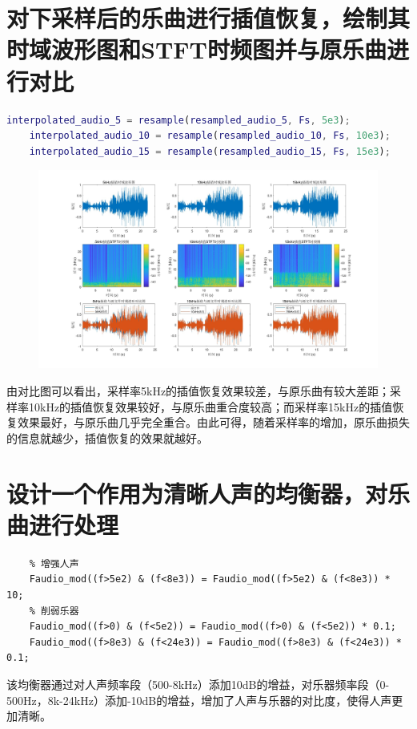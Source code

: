 \documentclass[UTF8,a4paper,11pt]{ctexart}
\begin{document}
\section{对下采样后的乐曲进行插值恢复，绘制其时域波形图和STFT时频图并与原乐曲进行对比}

\begin{lstlisting}[language=matlab]
    interpolated_audio_5 = resample(resampled_audio_5, Fs, 5e3);
    interpolated_audio_10 = resample(resampled_audio_10, Fs, 10e3);
    interpolated_audio_15 = resample(resampled_audio_15, Fs, 15e3);
\end{lstlisting}

\begin{figure}[H]   %
    \includegraphics[width=\linewidth]{PA4_3.jpg}
\end{figure}

由对比图可以看出，采样率5kHz的插值恢复效果较差，与原乐曲有较大差距；采样率10kHz的插值恢复效果较好，与原乐曲重合度较高；而采样率15kHz的插值恢复效果最好，与原乐曲几乎完全重合。由此可得，随着采样率的增加，原乐曲损失的信息就越少，插值恢复的效果就越好。

\section{设计一个作用为清晰人声的均衡器，对乐曲进行处理}
\begin{lstlisting}
    % 增强人声
    Faudio_mod((f>5e2) & (f<8e3)) = Faudio_mod((f>5e2) & (f<8e3)) * 10;
    % 削弱乐器
    Faudio_mod((f>0) & (f<5e2)) = Faudio_mod((f>0) & (f<5e2)) * 0.1;
    Faudio_mod((f>8e3) & (f<24e3)) = Faudio_mod((f>8e3) & (f<24e3)) * 0.1;
\end{lstlisting}

该均衡器通过对人声频率段（500-8kHz）添加10dB的增益，对乐器频率段（0-500Hz，8k-24kHz）添加-10dB的增益，增加了人声与乐器的对比度，使得人声更加清晰。
\end{document}
